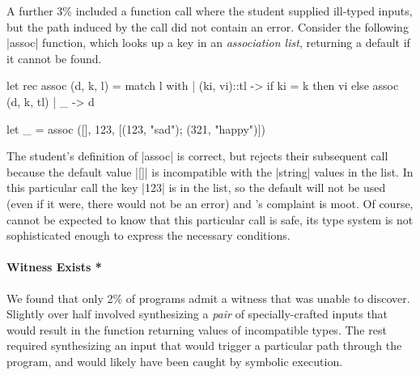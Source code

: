 A further 3\% included a function call where the
student supplied ill-typed inputs, but the path induced
by the call did not contain an error.
%
Consider the following |assoc| function, which
looks up a key in an \emph{association list}, returning a default if
it cannot be found.
%
\begin{code}
  let rec assoc (d, k, l) = match l with
    | (ki, vi)::tl ->
       if ki = k then
         vi
       else
         assoc (d, k, tl)
    | _ -> d

  let _ = assoc ([], 123, [(123, "sad"); (321, "happy")])
\end{code}
%
The student's definition of |assoc| is correct, but \ocaml rejects their
subsequent call because the default value |[]| is incompatible with the
|string| values in the list.
%
In this particular call the key |123| is in the list, so the default
will not be used (even if it were, there would not be an error) and
\ocaml's complaint is moot.
%
Of course, \ocaml cannot be expected to know that this particular call
is safe, its type system is not sophisticated enough to express the
necessary conditions.
%


\paragraph{Witness Exists *}
%
We found that only 2\% of programs admit a witness that \toolname
was unable to discover.
%
Slightly over half involved synthesizing a \emph{pair} of
specially-crafted inputs that would result in the function returning
values of incompatible types.
%
The rest required synthesizing an input that would trigger a
particular path through the program, and would likely have been caught
by symbolic execution.

